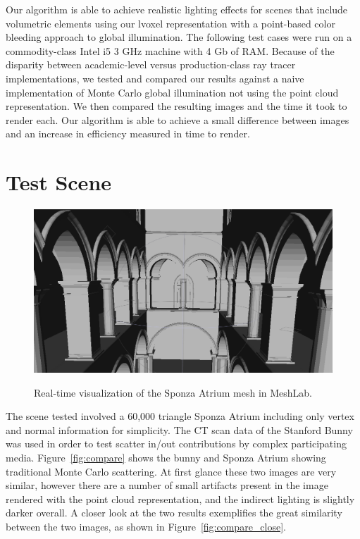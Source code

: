 \documentclass[12pt]{ucthesis}
\newcommand{\captionfonts}{\small\bf\ssp}
\begin{document}
Our algorithm is able to achieve realistic lighting effects for scenes that include volumetric elements using our lvoxel representation with a point-based color bleeding approach to global illumination.
The following test cases were run on a commodity-class Intel i5 3 GHz machine with 4 Gb of RAM.  Because of the disparity between academic-level versus production-class ray tracer implementations, we tested and compared our results against a naive implementation of Monte Carlo global illumination not using the point cloud representation.  We then compared the resulting images and the time it took to render each.  Our algorithm is able to achieve a small difference between images and an increase in efficiency measured in time to render.

\section{Test Scene}

\begin{figure}[h!]
    \centering
    \includegraphics[width=120mm]{img/sponza_vis.png}
    \captionfonts
    \caption{Real-time visualization of the Sponza Atrium mesh in MeshLab.}
    \label{fig:inscat}
\end{figure}

The scene tested involved a 60,000 triangle Sponza Atrium including only vertex and normal information for simplicity.  The CT scan data of the Stanford Bunny was used in order to test scatter in/out contributions by complex participating media.
Figure~\ref{fig:compare} shows the bunny and Sponza Atrium showing traditional Monte Carlo scattering.  At first glance these two images are very similar, however there are a number of small artifacts present in the image rendered with the point cloud representation, and the indirect lighting is slightly darker overall.  A closer look at the two results exemplifies the great similarity between the two images, as shown in Figure~\ref{fig:compare_close}.
\end{document}
